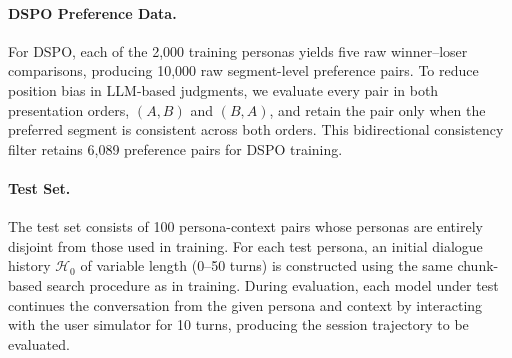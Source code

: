 
\paragraph{DSPO Preference Data.}
For DSPO, each of the 2{,}000 training personas yields five raw winner--loser comparisons, producing 10{,}000 raw segment-level preference pairs. To reduce position bias in LLM-based judgments, we evaluate every pair in both presentation orders, $(A,B)$ and $(B,A)$, and retain the pair only when the preferred segment is consistent across both orders. This bidirectional consistency filter retains 6{,}089 preference pairs for DSPO training.


\paragraph{Test Set.}
The test set consists of 100 persona-context pairs whose personas are entirely disjoint from those used in training. For each test persona, an initial dialogue history $\mathcal{H}_0$ of variable length (0--50 turns) is constructed using the same chunk-based search procedure as in training. During evaluation, each model under test continues the conversation from the given persona and context by interacting with the user simulator for 10 turns, producing the session trajectory to be evaluated.


